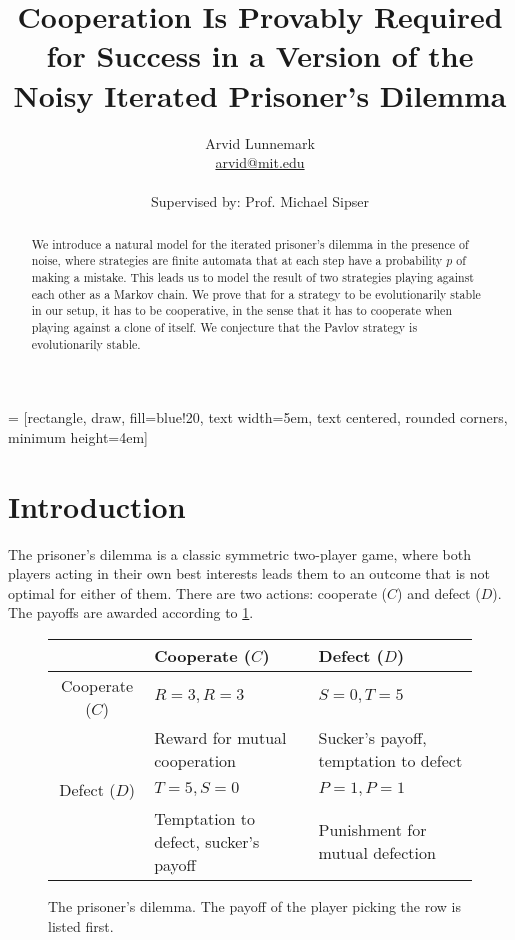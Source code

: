 \documentclass[12pt]{article}
\title{\Large \textbf{Cooperation Is Provably Required for Success in a Version of the Noisy Iterated Prisoner's Dilemma}}
\author{Arvid Lunnemark \\
\url{arvid@mit.edu}\\ \\
Supervised by: Prof. Michael Sipser}
\theoremstyle{definition}
\theoremstyle{remark}
\begin{document}
 = [rectangle, draw, fill=blue!20, 
    text width=5em, text centered, rounded corners, minimum height=4em]

\maketitle

\begin{abstract}
    We introduce a natural model for the iterated prisoner's dilemma in the presence of noise, where strategies are finite automata that at each step have a probability $p$ of making a mistake. This leads us to model the result of two strategies playing against each other as a Markov chain. We prove that for a strategy to be evolutionarily stable in our setup, it has to be cooperative, in the sense that it has to cooperate when playing against a clone of itself. We conjecture that the Pavlov strategy is evolutionarily stable.
\end{abstract}

\section{Introduction}

The prisoner's dilemma is a classic symmetric two-player game, where both players acting in their own best interests leads them to an outcome that is not optimal for either of them. There are two actions: cooperate ($C$) and defect ($D$). The payoffs are awarded according to \cref{fig:prisonersdilemmatable}.

\begin{figure}
    \centering
    \begin{tabularx}{0.8\textwidth}{|c | Y| Y|}
         & Cooperate ($C$) & Defect ($D$) \\ \hline
        Cooperate ($C$) & $R=3 , R=3$ & $S=0, T=5$ \\
         & Reward for mutual cooperation & Sucker's payoff, temptation to defect \\ \hline
        Defect ($D$) & $T=5, S=0$ & $P=1, P=1$ \\
        & Temptation to defect, sucker's payoff & Punishment for mutual defection \\ \hline
    \end{tabularx}
    \caption{The prisoner's dilemma. The payoff of the player picking the row is listed first.}
    \label{fig:prisonersdilemmatable}
\end{figure}
\end{document}

